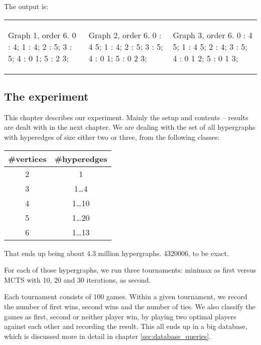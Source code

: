 The output is:

\begin{tabular}{|p{1.5in} | p{1.5in} | p{1.5in} |}
\begin{minipage}{1.5in}
\begin{datalisting}
Graph 1, order 6.
  0 : 4;
  1 : 4;
  2 : 5;
  3 : 5;
  4 : 0 1;
  5 : 2 3;

\end{datalisting}
\end{minipage}
&
\begin{minipage}{1.5in}
\begin{datalisting}
Graph 2, order 6.
  0 : 4 5;
  1 : 4;
  2 : 5;
  3 : 5;
  4 : 0 1;
  5 : 0 2 3;
\end{datalisting}
\end{minipage}
&
\begin{minipage}{1.5in}
\begin{datalisting}
Graph 3, order 6.
  0 : 4 5;
  1 : 4 5;
  2 : 4;
  3 : 5;
  4 : 0 1 2;
  5 : 0 1 3;
\end{datalisting}
\end{minipage}
\\
\end{tabular}


\subsection{The experiment}
\label{sec:experiment1}

This chapter describes our experiment. Mainly the setup and contents -- results are dealt with in the next chapter.
We are dealing with the set of all hypergraphs with hyperedges of size either two or three, from the following classes:

\begin{tabular}{ c | c }
\#vertices & \#hyperedges \\ \hline
2&1 \\ \hline
3&1\ldots4 \\ \hline
4&1\ldots10 \\ \hline
5&1\ldots20 \\ \hline
6&1\ldots13 \\ \hline
\end{tabular}

That ends up being about 4.3 million hypergraphs. 4320006, to be exact.

For each of those hypergraphs, we run three tournaments: minimax as first versus MCTS with 10, 20 and 30 iterations, as second.

Each tournament consists of 100 games. Within a given tournament, we record the number of first wins, second wins and the number of ties.
We also classify the games as first, second or neither player win, by playing two optimal players against each other and recording the result.
This all ends up in a big database, which is discussed more in detail in chapter \ref{sec:database_queries}.
